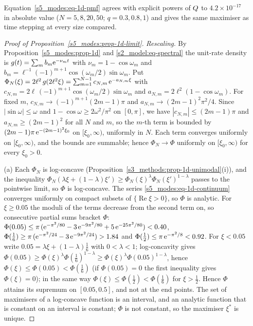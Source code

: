 Equation~\eqref{s5_modes:eq-1d-pmf} agrees with explicit powers of $Q$ to $4.2\times10^{-17}$ in absolute value
($N=5,8,20,50$; $q=0.3,0.8,1$) and gives the same maximiser as time stepping at every size compared.

\begin{proof}[Proof of Proposition~\ref{s5_modes:prop-1d-limit}]
\emph{Rescaling.} By Proposition~\ref{s5_modes:prop-1d} and \eqref{s2_model:eq-spectral} the unit-rate density is
$g(t)=\sum_m b_m\mathrm{e}^{-\nu_mt}$ with $\nu_m=1-\cos\omega_m$ and
$b_m=\ell^{-1}(-1)^{m+1}\cos(\omega_m/2)\sin\omega_m$. Put $\Phi_N(\xi)=2\ell^{2}\,g(2\ell^{2}\xi)
=\sum_{m=1}^{N-1}c_{N,m}\,\mathrm{e}^{-a_{N,m}\xi}$ with $c_{N,m}=2\ell\,(-1)^{m+1}\cos(\omega_m/2)\sin\omega_m$ and
$a_{N,m}=2\ell^{2}(1-\cos\omega_m)$. For fixed $m$, $c_{N,m}\to(-1)^{m+1}(2m-1)\pi$ and
$a_{N,m}\to(2m-1)^{2}\pi^{2}/4$. Since $|\sin\omega|\le\omega$ and $1-\cos\omega\ge2\omega^{2}/\pi^{2}$ on
$[0,\pi]$, we have $|c_{N,m}|\le(2m-1)\pi$ and $a_{N,m}\ge(2m-1)^{2}$ for all $N$ and $m$, so the $m$-th term is
bounded by $(2m-1)\pi\,\mathrm{e}^{-(2m-1)^{2}\xi_0}$ on $[\xi_0,\infty)$, uniformly in $N$. Each term converges
uniformly on $[\xi_0,\infty)$, and the bounds are summable; hence $\Phi_N\to\Phi$ uniformly on $[\xi_0,\infty)$
for every $\xi_0>0$.

(a) Each $\Phi_N$ is log-concave (Proposition~\ref{s3_methods:prop-1d-unimodal}(i)), and the inequality
$\Phi_N(\lambda\xi+(1-\lambda)\xi')\ge\Phi_N(\xi)^{\lambda}\Phi_N(\xi')^{1-\lambda}$ passes to the pointwise limit,
so $\Phi$ is log-concave. The series \eqref{s5_modes:eq-1d-continuum} converges uniformly on compact subsets of
$\{\operatorname{Re}\xi>0\}$, so $\Phi$ is analytic. For $\xi\ge0.05$ the moduli of the terms decrease from the
second term on, so consecutive partial sums bracket $\Phi$:
$\Phi(0.05)\le\pi\,(\mathrm{e}^{-\pi^{2}/80}-3\,\mathrm{e}^{-9\pi^{2}/80}+5\,\mathrm{e}^{-25\pi^{2}/80})<0.40$,
$\Phi(\tfrac16)\ge\pi\,(\mathrm{e}^{-\pi^{2}/24}-3\,\mathrm{e}^{-9\pi^{2}/24})>1.84$ and
$\Phi(\tfrac12)\le\pi\,\mathrm{e}^{-\pi^{2}/8}<0.92$.
For $\xi<0.05$ write $0.05=\lambda\xi+(1-\lambda)\tfrac16$ with $0<\lambda<1$; log-concavity gives
$\Phi(0.05)\ge\Phi(\xi)^{\lambda}\Phi(\tfrac16)^{1-\lambda}\ge\Phi(\xi)^{\lambda}\Phi(0.05)^{1-\lambda}$, hence
$\Phi(\xi)\le\Phi(0.05)<\Phi(\tfrac16)$ (if $\Phi(0.05)=0$ the first inequality gives $\Phi(\xi)=0$); in the same
way $\Phi(\xi)\le\Phi(\tfrac12)<\Phi(\tfrac16)$ for $\xi>\tfrac12$. Hence $\Phi$ attains its
supremum on $[0.05,0.5]$, and not at the end points. The set of maximisers of a log-concave function is an interval,
and an analytic function that is constant on an interval is constant; $\Phi$ is not constant, so the maximiser
$\xi^{*}$ is unique.


\end{proof}
